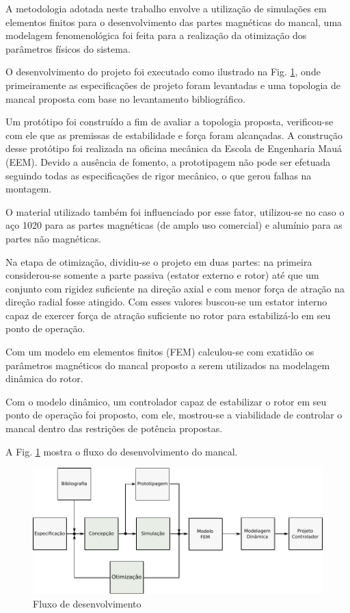 A metodologia adotada neste trabalho envolve a utilização de simulações em elementos finitos para o desenvolvimento das partes magnéticas do mancal, uma modelagem fenomenológica foi feita para a realização da otimização dos parâmetros físicos do sistema. 

O desenvolvimento do projeto foi executado como ilustrado na Fig. \ref{fig:metodologia:fluxo:dev}, onde primeiramente as especificações de projeto foram levantadas e uma topologia de mancal proposta com base no levantamento bibliográfico. 

Um protótipo foi construído a fim de avaliar a topologia proposta, verificou-se com ele que as premissas de estabilidade e força foram alcançadas. A construção desse protótipo foi realizada na oficina mecânica da Escola de Engenharia Mauá (EEM). Devido a ausência de fomento, a prototipagem não pode ser efetuada seguindo todas as especificações de rigor mecânico, o que gerou falhas na montagem.

O material utilizado também foi influenciado por esse fator, utilizou-se no caso o aço 1020 para as partes magnéticas (de amplo uso comercial) e alumínio para as partes não magnéticas. 

Na etapa de otimização, dividiu-se o projeto em duas partes: na primeira considerou-se somente a parte passiva (estator externo e rotor) até que um conjunto com rigidez suficiente na direção axial e com menor força de atração na direção radial fosse atingido. Com esses valores buscou-se um estator interno capaz de exercer força de atração suficiente no rotor para estabilizá-lo em seu ponto de operação.

Com um modelo em elementos finitos (FEM) calculou-se com exatidão os parâmetros magnéticos do mancal proposto a serem utilizados na modelagem dinâmica do rotor.

Com o modelo dinâmico, um controlador capaz de estabilizar o rotor em seu ponto de operação foi proposto, com ele, mostrou-se a viabilidade de controlar o mancal dentro das restrições de potência propostas. 

A Fig. \ref{fig:metodologia:fluxo:dev} mostra o fluxo do desenvolvimento do mancal.

 
\begin{figure}[th!]
	\centering
	\includegraphics[width=1\linewidth]{Figs/metodologia_fluxo_dev}
	\caption{Fluxo de desenvolvimento}
	\label{fig:metodologia:fluxo:dev}
\end{figure} 
 
